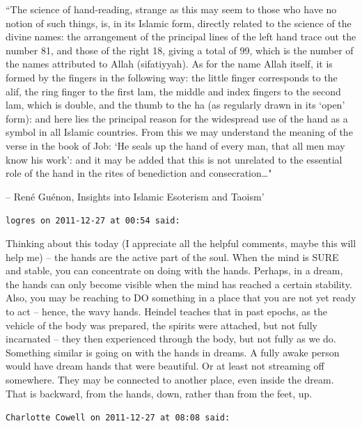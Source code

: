 \begin{footnotesize}
\begin{sffamily}
``The science of hand-reading, strange as this may seem to those who have no notion of such things, is, in its Islamic form, directly related to the science of the divine names: the arrangement of the principal lines of the left hand trace out the number 81, and those of the right 18, giving a total of 99, which is the number of the names attributed to Allah (sifatiyyah). As for the name Allah itself, it is formed by the fingers in the following way: the little finger corresponds to the alif, the ring finger to the first lam, the middle and index fingers to the second lam, which is double, and the thumb to the ha (as regularly drawn in its `open' form): and here lies the principal reason for the widespread use of the hand as a symbol in all Islamic countries. From this we may understand the meaning of the verse in the book of Job: `He seals up the hand of every man, that all men may know his work': and it may be added that this is not unrelated to the essential role of the hand in the rites of benediction and consecration…"

– René Guénon, Insights into Islamic Esoterism and Taoism'


\hfill

\texttt{logres on 2011-12-27 at 00:54 said: }

Thinking about this today (I appreciate all the helpful comments, maybe this will help me) – the hands are the active part of the soul. When the mind is SURE and stable, you can concentrate on doing with the hands. Perhaps, in a dream, the hands can only become visible when the mind has reached a certain stability. Also, you may be reaching to DO something in a place that you are not yet ready to act – hence, the wavy hands. Heindel teaches that in past epochs, as the vehicle of the body was prepared, the spirits were attached, but not fully incarnated – they then experienced through the body, but not fully as we do. Something similar is going on with the hands in dreams. A fully awake person would have dream hands that were beautiful. Or at least not streaming off somewhere. They may be connected to another place, even inside the dream. That is backward, from the hands, down, rather than from the feet, up.


\hfill

\texttt{Charlotte Cowell on 2011-12-27 at 08:08 said: }


\end{sffamily}
\end{footnotesize}
